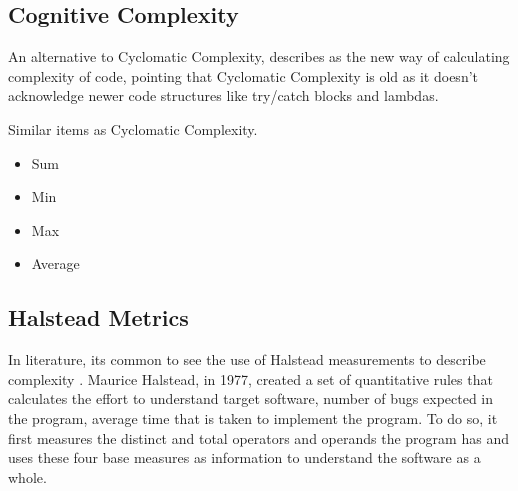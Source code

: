 \subsection{Cognitive Complexity}

An alternative to Cyclomatic Complexity, \cite{article:sonarpaper} describes as the new way of calculating complexity of code,
pointing that Cyclomatic Complexity is old as it doesn't acknowledge newer code structures like try/catch blocks and lambdas.

Similar items as Cyclomatic Complexity.

\begin{itemize}
  \item Sum 
  \item Min 
  \item Max 
  \item Average 
\end{itemize}

\subsection{Halstead Metrics}

In literature, its common to see the use of Halstead measurements to describe complexity \cite{article:complexity_with_halstead}.
Maurice Halstead, in 1977, created a set of quantitative rules that calculates the effort to understand target software, number of bugs
expected in the program, average time that is taken to implement the program. To do so, it first measures the distinct and total
operators and operands the program has and uses these four base measures as information to understand the software as a whole.

